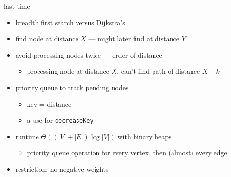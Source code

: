 \begin{frame}{last time}
    \begin{itemize}
        \item breadth first search versus Dijkstra's
        \item find node at distance $X$ --- might later find at distance $Y$
        \item avoid processing nodes twice --- order of distance
            \begin{itemize}
            \item processing node at distance $X$, can't find path of distance $X-k$
            \end{itemize}
        \item priority queue to track pending nodes
            \begin{itemize}
            \item key = distance
            \item a use for \texttt{decreaseKey}
            \end{itemize}
        \item runtime $\Theta((|V|+|E|)\log |V|)$ with binary heaps
            \begin{itemize}
            \item priority queue operation for every vertex, then (almost) every edge
            \end{itemize}
        \vspace{.5cm}
        \item restriction: no negative weights
    \end{itemize}
\end{frame}
